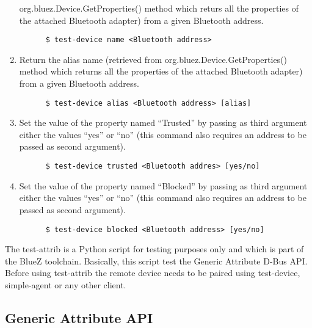 \documentclass[11pt]{article}
\begin{document}
\begin{enumerate}
        org.bluez.Device.GetProperties() method which returs all the
        properties of the attached Bluetooth adapter) from a given
        Bluetooth address.
    \begin{verbatim}
      $ test-device name <Bluetooth address>
    \end{verbatim}
  \item Return the alias name (retrieved from
        org.bluez.Device.GetProperties() method which returns all the
        properties of the attached Bluetooth adapter) from a given
        Bluetooth address.
    \begin{verbatim}
      $ test-device alias <Bluetooth address> [alias]
    \end{verbatim}
  \item Set the value of the property named ``Trusted'' by passing as
        third argument either the values ``yes'' or ``no''
        (this command also requires an address to be passed as second
         argument).
    \begin{verbatim}
      $ test-device trusted <Bluetooth addres> [yes/no]
    \end{verbatim}
  \item Set the value of the property named ``Blocked'' by passing as
        third argument either the values ``yes'' or ``no''
        (this command also requires an address to be passed as second
         argument).
    \begin{verbatim}
      $ test-device blocked <Bluetooth address> [yes/no]
    \end{verbatim}
\end{enumerate}

The test-attrib is a Python script for testing purposes only and which is part
of the BlueZ toolchain. Basically, this script test the Generic Attribute
D-Bus API. Before using test-attrib the remote device needs to be paired using
test-device, simple-agent or any other client.

\subsection{Generic Attribute API}
\end{document}

